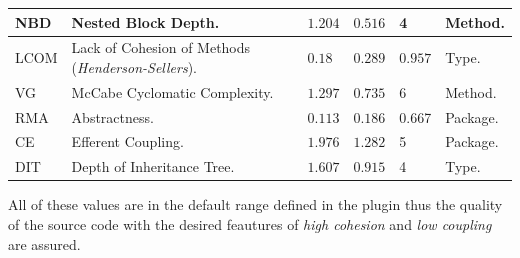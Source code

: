 \begin{longtable}{|p{1cm}|p{4cm}|p{1cm}|p{1cm}|p{1cm}|p{1cm}|p{1.5cm}|}
		NBD&Nested Block Depth.&&$1.204$&$0.516$&4&Method. \\ \hline
		LCOM&Lack of Cohesion of Methods (\textit{Henderson-Sellers}).&&$0.18$&$0.289$&$0.957$&Type.\\ \hline 
		VG&McCabe Cyclomatic Complexity.&&$1.297$&$0.735$&6&Method. \\ \hline
		RMA&Abstractness.&&$0.113$&$0.186$&0.667&Package. \\ \hline
		CE&Efferent Coupling.&&$1.976$&$1.282$&5&Package. \\ \hline
		DIT&Depth of Inheritance Tree.&&$1.607$&$0.915$&4&Type. \\ \hline
    	 \hline
        \end{longtable}      

All of these values are in the default range defined in the plugin thus the quality of the source code 
with the desired feautures of \textit{high cohesion} and \textit{low coupling} are assured.